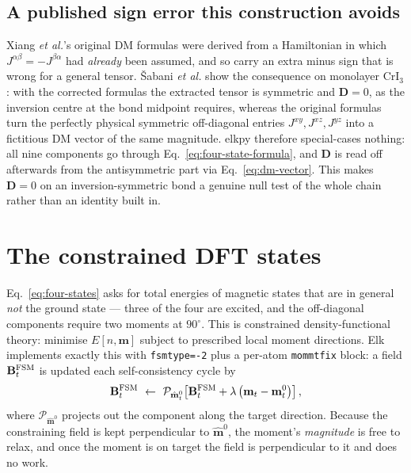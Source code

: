\documentclass[11pt]{article}
\begin{document}
\subsection{A published sign error this construction avoids}

Xiang \emph{et al.}'s original DM formulas were derived from a Hamiltonian in
which $J^{\alpha\beta}=-J^{\beta\alpha}$ had \emph{already} been assumed, and so
carry an extra minus sign that is wrong for a general tensor. \v{S}abani
\emph{et al.} show the consequence on monolayer CrI$_3$: with the corrected
formulas the extracted tensor is symmetric and $\mathbf D=0$, as the inversion
centre at the bond midpoint requires, whereas the original formulas turn the
perfectly physical symmetric off-diagonal entries $J^{xy},J^{xz},J^{yz}$ into a
fictitious DM vector of the same magnitude. elkpy therefore special-cases
nothing: all nine components go through Eq.~\eqref{eq:four-state-formula}, and
$\mathbf D$ is read off afterwards from the antisymmetric part via
Eq.~\eqref{eq:dm-vector}. This makes $\mathbf D=0$ on an inversion-symmetric
bond a genuine null test of the whole chain rather than an identity built in.

\section{The constrained DFT states}

Eq.~\eqref{eq:four-states} asks for total energies of magnetic states that are
in general \emph{not} the ground state --- three of the four are excited, and
the off-diagonal components require two moments at $90^\circ$. This is
constrained density-functional theory: minimise $E[n,\mathbf m]$ subject to
prescribed local moment directions. Elk implements exactly this with
\texttt{fsmtype=-2} plus a per-atom \texttt{mommtfix} block: a field
$\mathbf B^{\rm FSM}_t$ is updated each self-consistency cycle by
\begin{equation}
  \mathbf B^{\rm FSM}_t\ \leftarrow\ \mathcal P_{\hat{\mathbf m}^0_t}\!\left[
    \mathbf B^{\rm FSM}_t+\lambda\left(\mathbf m_t-\mathbf m^0_t\right)\right],
  \label{eq:fsm}
\end{equation}
where $\mathcal P_{\hat{\mathbf m}^0}$ projects out the component along the
target direction. Because the constraining field is kept perpendicular to
$\hat{\mathbf m}^0$, the moment's \emph{magnitude} is free to relax, and once
the moment is on target the field is perpendicular to it and does no work.
\end{document}
